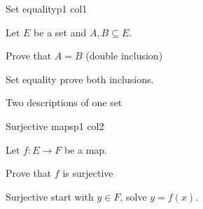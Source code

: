 \documentclass[course]{neyvia-study}
\begin{document}
\maketitle


\begin{concept}{Set equality}{p1 col1}
\begin{definition}
Let $E$ be a set and $A,B\subseteq E$.
\end{definition}
\begin{method}{Prove that $A=B$ (double inclusion)}
\end{method}
\begin{reflex}
Set equality \ra{} prove both inclusions.
\end{reflex}
\begin{worked}{Two descriptions of one set}
\end{worked}
\begin{traps}
\end{traps}
\begin{practice}
\end{practice}
\end{concept}

\begin{concept}{Surjective maps}{p1 col2}
\begin{definition}
Let $f:E\to F$ be a map.
\end{definition}
\begin{method}{Prove that $f$ is surjective}
\end{method}
\begin{reflex}
Surjective \ra{} start with $y\in F$, solve $y=f(x)$.
\end{reflex}
\end{concept}
\end{document}
